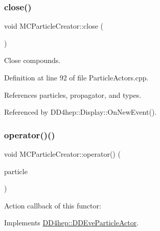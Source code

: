 \hypertarget{struct_d_d4hep_1_1_m_c_particle_creator_aa238c6f5a187841abb59e61db1c3ddf9}{}\label{struct_d_d4hep_1_1_m_c_particle_creator_aa238c6f5a187841abb59e61db1c3ddf9} 
\subsubsection{\texorpdfstring{close()}{close()}}
{\footnotesize\ttfamily void M\+C\+Particle\+Creator\+::close (\begin{DoxyParamCaption}{ }\end{DoxyParamCaption})}



Close compounds. 



Definition at line 92 of file Particle\+Actors.\+cpp.



References particles, propagator, and types.



Referenced by D\+D4hep\+::\+Display\+::\+On\+New\+Event().

\hypertarget{struct_d_d4hep_1_1_m_c_particle_creator_a42ebf0f3d55a5f02d9617ccf7aaf550a}{}\label{struct_d_d4hep_1_1_m_c_particle_creator_a42ebf0f3d55a5f02d9617ccf7aaf550a} 
\subsubsection{\texorpdfstring{operator()()}{operator()()}}
{\footnotesize\ttfamily void M\+C\+Particle\+Creator\+::operator() (\begin{DoxyParamCaption}\item[{const \hyperlink{class_d_d4hep_1_1_d_d_eve_particle}{D\+D\+Eve\+Particle} \&}]{particle }\end{DoxyParamCaption})\hspace{0.3cm}{\ttfamily [virtual]}}



Action callback of this functor\+: 



Implements \hyperlink{struct_d_d4hep_1_1_d_d_eve_particle_actor_a27707fecbdb50e7566ec01c784fcc669}{D\+D4hep\+::\+D\+D\+Eve\+Particle\+Actor}.




